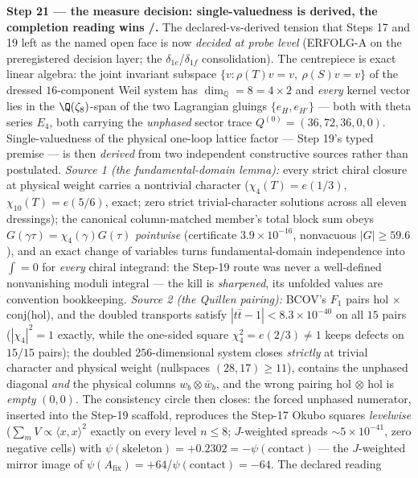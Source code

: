 \documentclass[11pt,a4paper]{article}
\theoremstyle{definition}
\begin{document}
\par\smallskip\noindent\textbf{Step 21 --- the measure decision: single-valuedness is derived,
the completion reading wins \mE/\mC.} The declared-vs-derived tension that Steps 17 and 19 left
as the named open face is now \emph{decided at probe level} (ERFOLG-A on the preregistered
decision layer; the $\delta_{1e}$/$\delta_{1f}$ consolidation). The centrepiece is exact linear
algebra: the joint invariant subspace $\{v:\rho(T)v=v,\ \rho(S)v=v\}$ of the dressed
$16$-component Weil system has $\dim_{\mathbb Q}=8=4\times2$ and \emph{every} kernel vector
lies in the $\Q(\zeta_8)$-span of the two Lagrangian gluings $\{e_H,e_{H'}\}$ --- both with
theta series $E_4$, both carrying the \emph{unphased} sector trace $Q^{(0)}=(36,72,36,0,0)$.
Single-valuedness of the physical one-loop lattice factor --- Step 19's typed premise --- is
then \emph{derived} from two independent constructive sources rather than postulated.
\emph{Source 1 (the fundamental-domain lemma):} every strict chiral closure at physical weight
carries a nontrivial character ($\chi_4(T)=e(1/3)$, $\chi_{10}(T)=e(5/6)$, exact; zero strict
trivial-character solutions across all eleven dressings); the canonical column-matched member's
total block sum obeys $G(\gamma\tau)=\chi_4(\gamma)G(\tau)$ \emph{pointwise} (certificate
$3.9\times10^{-16}$, nonvacuous $|G|\ge59.6$), and an exact change of variables turns
fundamental-domain independence into $\int=0$ for \emph{every} chiral integrand: the Step-19
route was never a well-defined nonvanishing moduli integral --- the kill is \emph{sharpened},
its unfolded values are convention bookkeeping. \emph{Source 2 (the Quillen pairing):} BCOV's
$F_1$ pairs hol$\,\times\,$conj(hol), and the doubled transports satisfy
$|t\bar t-1|<8.3\times10^{-40}$ on all $15$ pairs ($|\chi_4|^2=1$ exactly, while the one-sided
square $\chi_4^2=e(2/3)\neq1$ keeps defects on $15/15$ pairs); the doubled $256$-dimensional
system closes \emph{strictly} at trivial character and physical weight (nullspaces
$(28,17)\ge11$), contains the unphased diagonal \emph{and} the physical columns
$w_b\otimes\bar w_b$, and the wrong pairing hol$\,\otimes\,$hol is \emph{empty} $(0,0)$. The
consistency circle then closes: the forced unphased numerator, inserted into the Step-19
scaffold, reproduces the Step-17 Okubo squares \emph{levelwise} ($\sum_mV\propto\langle
x,x\rangle^2$ exactly on every level $n\le8$; $J$-weighted spreads $\sim5\times10^{-41}$, zero
negative cells) with $\psi(\text{skeleton})=+0.2302=-\psi(\text{contact})$ --- the $J$-weighted
mirror image of $\psi(A_{\mathrm{fix}})=+64$/$\psi(\text{contact})=-64$. The declared reading
\end{document}
